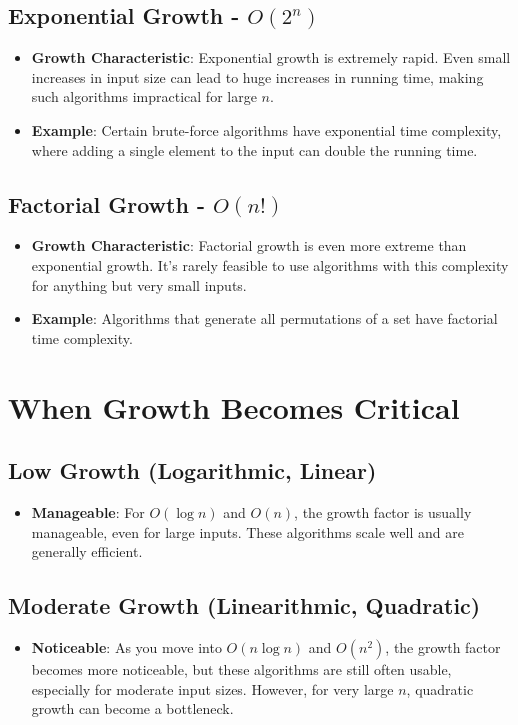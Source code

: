 \documentclass{article}
\begin{document}
\subsection{Exponential Growth - \( O(2^n) \)}
\begin{itemize}
    \item \textbf{Growth Characteristic}: Exponential growth is extremely rapid. Even small increases in input size can lead to huge increases in running time, making such algorithms impractical for large \( n \).
    \item \textbf{Example}: Certain brute-force algorithms have exponential time complexity, where adding a single element to the input can double the running time.
\end{itemize}

\subsection{Factorial Growth - \( O(n!) \)}
\begin{itemize}
    \item \textbf{Growth Characteristic}: Factorial growth is even more extreme than exponential growth. It's rarely feasible to use algorithms with this complexity for anything but very small inputs.
    \item \textbf{Example}: Algorithms that generate all permutations of a set have factorial time complexity.
\end{itemize}

\section{When Growth Becomes Critical}

\subsection{Low Growth (Logarithmic, Linear)}
\begin{itemize}
    \item \textbf{Manageable}: For \( O(\log n) \) and \( O(n) \), the growth factor is usually manageable, even for large inputs. These algorithms scale well and are generally efficient.
\end{itemize}

\subsection{Moderate Growth (Linearithmic, Quadratic)}
\begin{itemize}
    \item \textbf{Noticeable}: As you move into \( O(n \log n) \) and \( O(n^2) \), the growth factor becomes more noticeable, but these algorithms are still often usable, especially for moderate input sizes. However, for very large \( n \), quadratic growth can become a bottleneck.
\end{itemize}
\end{document}
